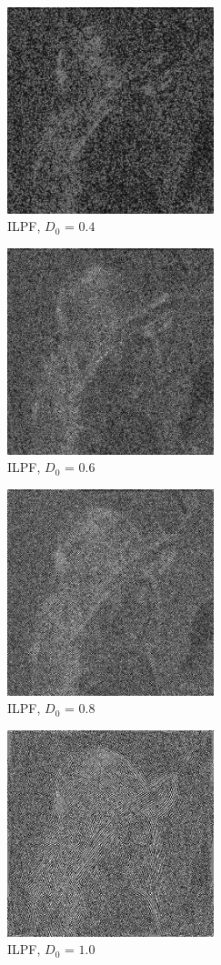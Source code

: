 \documentclass[conference]{IEEEtran}
\begin{document}
\begin{figure}[H]
\centerline{\includegraphics[width=6cm]{ILPF0_4.jpg}}
\caption{ILPF, $D_0$ = $0.4$}
\label{ILPF0.4}
\end{figure}

\begin{figure}[H]
\centerline{\includegraphics[width=6cm]{ILPF0_6.jpg}}
\caption{ILPF, $D_0$ = $0.6$}
\label{ILPF0.6}
\end{figure}

\begin{figure}[H]
\centerline{\includegraphics[width=6cm]{ILPF0_8.jpg}}
\caption{ILPF, $D_0$ = $0.8$}
\label{ILPF0.8}
\end{figure}

\begin{figure}[H]
\centerline{\includegraphics[width=6cm]{ILPF1_0.jpg}}
\caption{ILPF, $D_0$ = $1.0$}
\label{ILPF1.0}
\end{figure}
\end{document}
